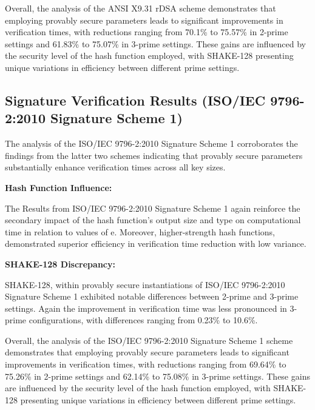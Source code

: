 \documentclass[]{final_report}
\theoremstyle{definition}
\begin{document}
Overall, the analysis of the ANSI X9.31 rDSA scheme demonstrates that employing provably secure parameters leads to significant improvements in verification times, with reductions ranging from 70.1\% to 75.57\% in 2-prime settings and 61.83\% to 75.07\% in 3-prime settings. These gains are influenced by the security level of the hash function employed, with SHAKE-128 presenting unique variations in efficiency between different prime settings.

\newpage
\subsection{Signature Verification Results (ISO/IEC 9796-2:2010 Signature Scheme 1)}

The analysis of the ISO/IEC 9796-2:2010 Signature Scheme 1 corroborates the findings from the latter two schemes indicating that provably secure parameters substantially enhance verification times across all key sizes.

\textbf{Hash Function Influence:}  

The Results from ISO/IEC 9796-2:2010 Signature Scheme 1 again reinforce the secondary impact of the hash function's output size and type on computational time in relation to values of e. Moreover, higher-strength hash functions, demonstrated superior efficiency in verification time reduction with low variance.

\textbf{SHAKE-128 Discrepancy:} 

SHAKE-128, within provably secure instantiations of ISO/IEC 9796-2:2010 Signature Scheme 1 exhibited notable differences between 2-prime and 3-prime settings. Again the improvement in verification time was less pronounced in 3-prime configurations, with differences ranging from 0.23\%  to 10.6\%. 

Overall, the analysis of the ISO/IEC 9796-2:2010 Signature Scheme 1 scheme demonstrates that employing provably secure parameters leads to significant improvements in verification times, with reductions ranging from 69.64\% to 75.26\% in 2-prime settings and 62.14\% to 75.08\% in 3-prime settings. These gains are influenced by the security level of the hash function employed, with SHAKE-128 presenting unique variations in efficiency between different prime settings.
\end{document}
